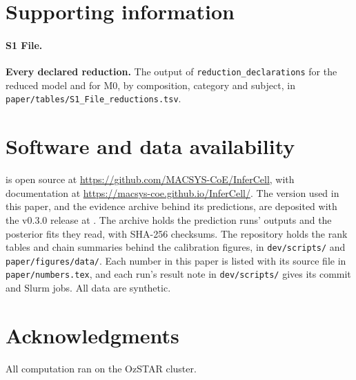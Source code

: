 \section*{Supporting information}

\paragraph*{S1 File.}
\label{S1_File}
\textbf{Every declared reduction.} The output of \texttt{reduction\_declarations} for the
reduced model and for M0, by composition, category and subject, in
\texttt{paper/tables/S1\_File\_reductions.tsv}.

\section*{Software and data availability}
\label{sec:availability}

\IC{} is open source at \url{https://github.com/MACSYS-CoE/InferCell}, with
documentation at \url{https://macsys-coe.github.io/InferCell/}. The version used in this paper, and the evidence archive behind
its predictions, are deposited with the v0.3.0 release at . The archive holds the prediction runs' outputs and the posterior fits they read, with SHA-256 checksums. The repository holds the rank tables and chain summaries behind the calibration figures, in \texttt{dev/scripts/} and \texttt{paper/figures/data/}. Each number in this paper is listed with its source file in
\texttt{paper/numbers.tex}, and each run's result note in \texttt{dev/scripts/} gives its
commit and Slurm jobs. All data are synthetic.

\section*{Acknowledgments}
All computation ran on the OzSTAR cluster. 
